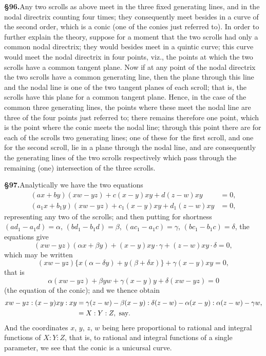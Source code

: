 \documentclass[11pt,a4paper]{article}
\begin{document}
\textbf{\S 96.}\quad Any two scrolls as above meet in the three fixed generating lines, and in the nodal directrix counting four times; they consequently meet besides in a curve of the second order, which is a conic (one of the conies just referred to). In order to further explain the theory, suppose for a moment that the two scrolls had only a common nodal directrix; they would besides meet in a quintic curve; this curve would meet the nodal directrix in four points, viz., the points at which the two scrolls have a common tangent plane. Now if at any point of the nodal directrix the two scrolls have a common generating line, then the plane through this line and the nodal line is one of the two tangent planes of each scroll; that is, the scrolls have this plane for a common tangent plane. Hence, in the case of the common three generating lines, the points where these meet the nodal line are three of the four points just referred to; there remains therefore one point, which is the point where the conic meets the nodal line; through this point there are for each of the scrolls two generating lines; one of these for the first scroll, and one for the second scroll, lie in a plane through the nodal line, and are consequently the generating lines of the two scrolls respectively which pass through the remaining (one) intersection of the three scrolls.

\textbf{\S 97.}\quad Analytically we have the two equations
\begin{align*}
(ax + by)(xw - yz) + c(x - y)xy + d(z - w)xy &= 0, \\
(a_1x + b_1y)(xw - yz) + c_1(x - y)xy + d_1(z - w)xy &= 0,
\end{align*}
representing any two of the scrolls; and then putting for shortness $(ad_1 - a_1d) = \alpha$, $(bd_1 - b_1d) = \beta$, $(ac_1 - a_1c) = \gamma$, $(bc_1 - b_1c) = \delta$, the equations give
\[
(xw - yz)(\alpha x + \beta y) + (x - y)xy \cdot \gamma + (z - w)xy \cdot \delta = 0,
\]
which may be written
\[
(xw - yz)\{x(\alpha - \delta y) + y(\beta + \delta x)\} + \gamma(x - y)xy = 0,
\]
that is
\[
\alpha(xw - yz) + \beta yw + \gamma(x - y)y + \delta(xw - yz) = 0
\]
(the equation of the conic); and we thence obtain
\begin{align*}
xw - yz : (x - y)xy : xy &= \gamma(z - w) - \beta(x - y) : \delta(z - w) - \alpha(x - y) : \alpha(z - w) - \gamma w,\notag \\
&= X : Y : Z, \text{ say}.
\end{align*}
And the coordinates $x$, $y$, $z$, $w$ being here proportional to rational and integral functions of $X : Y : Z$, that is, to rational and integral functions of a single parameter, we see that the conic is a unicursal curve.
\end{document}
